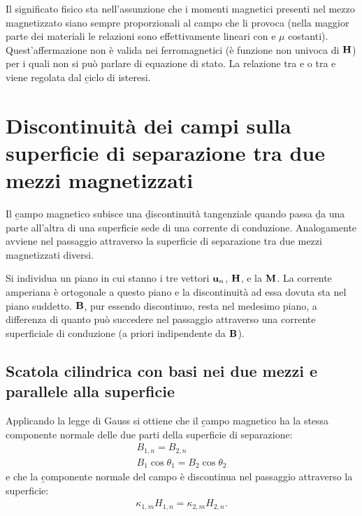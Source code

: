 Il significato fisico sta nell'assunzione che i momenti magnetici presenti nel mezzo magnetizzato siano sempre proporzionali al campo che li provoca (nella maggior parte dei materiali le relazioni sono effettivamente lineari con \dchim e $\mu$ costanti). Quest'affermazione non è valida nei ferromagnetici (\dchim è funzione non univoca di $\mathbf{H}$) per i quali non si può parlare di equazione di stato. La relazione tra \dM e \dH o tra \dB e \dH viene regolata dal \b{ciclo di isteresi}.

\section{Discontinuità dei campi sulla superficie di separazione tra due mezzi magnetizzati}%
Il \b{campo magnetico} subisce una \b{discontinuità tangenziale} quando passa \b{da una parte all'altra di una superficie sede di una corrente di conduzione}. Analogamente avviene nel passaggio attraverso la superficie di separazione tra due mezzi magnetizzati diversi.

Si individua un piano in cui stanno i tre vettori $\mathbf{u}_n$, $\mathbf{H}$, \dB e la \magn $\mathbf{M}$. La corrente amperiana \djsm è ortogonale a questo piano e la discontinuità ad essa dovuta sta nel piano suddetto. $\mathbf{B}$, pur essendo discontinuo, resta nel medesimo piano, a differenza di quanto può succedere nel passaggio attraverso una corrente superficiale di conduzione (a priori indipendente da $\mathbf{B}$).

\subsection{Scatola cilindrica con basi nei due mezzi e parallele alla superficie}
Applicando la legge di Gauss si ottiene che il \b{campo magnetico ha la stessa componente normale delle due parti della superficie di separazione}:
\begin{equation}\begin{split}
B_{1,n}=B_{2,n} \\
B_1\cos{\theta_1}=B_2\cos{\theta_2}
\end{split}\end{equation}
e che la \b{componente normale del campo \dH è discontinua nel passaggio attraverso la superficie}:
\begin{equation}\begin{split}
\kappa_{1,m}H_{1,n}=\kappa_{2,m}H_{2,n}.
\end{split}\end{equation}

